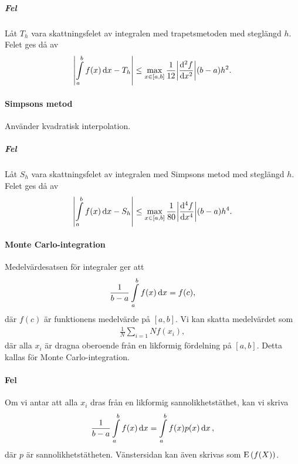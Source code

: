 \subparagraph{Fel}
Låt $T_{h}$ vara skattningsfelet av integralen med trapetsmetoden med steglängd $h$. Felet ges då av
\begin{align*}
	\abs{\int\limits_{a}^{b}f(x)\dd{x} - T_{h}} \leq \max\limits_{x\in [a, b]}\frac{1}{12}\abs{\dv[2]{f}{x} (x)}(b - a)h^{2}.
\end{align*}

\paragraph{Simpsons metod}
Använder kvadratisk interpolation.

\subparagraph{Fel}
Låt $S_{h}$ vara skattningsfelet av integralen med Simpsons metod med steglängd $h$. Felet ges då av
\begin{align*}
	\abs{\int\limits_{a}^{b}f(x)\dd{x} - S_{h}} \leq \max\limits_{x\in [a, b]}\frac{1}{80}\abs{\dv[4]{f}{x} (x)}(b - a)h^{4}.
\end{align*}

\paragraph{Monte Carlo-integration}
Medelvärdesatsen för integraler ger att
\begin{align*}
	\frac{1}{b - a}\int\limits_{a}^{b}f(x)\dd{x} = f(c),
\end{align*}
där $f(c)$ är funktionens medelvärde på $[a, b]$. Vi kan skatta medelvärdet som
\begin{align*}
	\frac{1}{N}\sum\limits_{i = 1}{N}f(x_{i}),
\end{align*}
där alla $x_{i}$ är dragna oberoende från en likformig fördelning på $[a, b]$. Detta kallas för Monte Carlo-integration.

\paragraph{Fel}
Om vi antar att alla $x_{i}$ dras från en likformig sannolikhetstäthet, kan vi skriva
\begin{align*}
	\frac{1}{b - a}\int\limits_{a}^{b}f(x)\dd{x} = \int\limits_{a}^{b}f(x)p(x)\dd{x},
\end{align*}
där $p$ är sannolikhetstätheten. Vänstersidan kan även skrivas som $\text{E}\left(f(X)\right)$.

